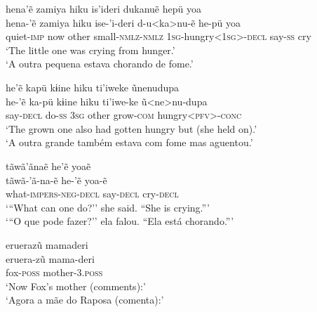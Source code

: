 \documentclass[output=paper,
modfonts,nonflat
]{langsci/langscibook}
\begin{document}
\ea   hena'ẽ zamiya hiku is'ideri dukanuẽ hepü yoa\\[.3em]
\gll hena-'ẽ zamiya hiku ise-'i-deri d-u<ka>nu-ẽ he-pü yoa\\
quiet-\textsc{imp} now other small-\textsc{nmlz-nmlz} \textsc{1sg}-hungry<\textsc{1sg}>-\textsc{decl} say-\textsc{ss} cry\\
\glt   `The little one was crying from hunger.' \\
`A outra pequena estava chorando de fome.'
\z  

\ea   he'ẽ kapü  kɨine hiku ti'iweke ũnenudupa\\[.3em]
\gll  he-'ẽ ka-pü  kɨine hiku ti'iwe-ke ũ<ne>nu-dupa\\
say-\textsc{decl} do-\textsc{ss} \textsc{3sg} other grow-\textsc{com} hungry<\textsc{pfv}>-\textsc{conc}\\
\glt   `The grown one also had gotten hungry but (she held on).' \\
`A outra grande também estava com fome mas aguentou.'\\

\z  

\ea   tãwã'ãnaẽ he'ẽ yoaẽ  \\[.3em]
\gll tãwã-'ã-na-ẽ he-'ẽ yoa-ẽ \\
what-\textsc{impers-neg-decl} say-\textsc{decl} cry-\textsc{decl}\\                            
\glt  `{``}What can one do?'' she said. ``She is crying.{''}'\\
 `{``}O que pode fazer?'' ela falou. ``Ela está chorando.{''}'
\z  


\ea eruerazũ mamaderi \\[.3em] 
\gll eruera-zũ mama-deri \\
fox-\textsc{poss} mother-\textsc{3.poss}\\           
\glt  `Now Fox's mother (comments):' \\
`Agora a mãe do Raposa (comenta):'\\
\z  
\end{document}
